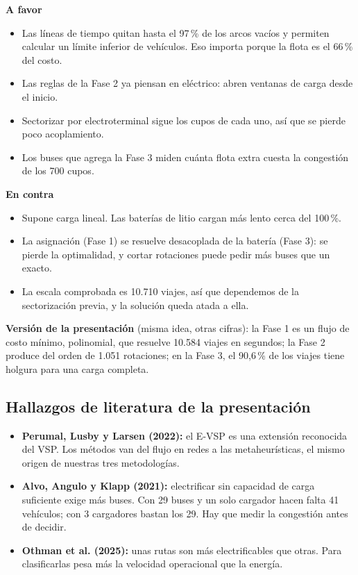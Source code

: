 \documentclass[11pt,a4paper,parskip=half]{scrartcl}
\begin{document}
\begin{minipage}[t]{0.48\linewidth}
\textbf{A favor}
\begin{itemize}
  \item Las líneas de tiempo quitan hasta el 97\,\% de los arcos vacíos y permiten calcular un límite inferior de vehículos. Eso importa porque la flota es el 66\,\% del costo.
  \item Las reglas de la Fase 2 ya piensan en eléctrico: abren ventanas de carga desde el inicio.
  \item Sectorizar por electroterminal sigue los cupos de cada uno, así que se pierde poco acoplamiento.
  \item Los buses que agrega la Fase 3 miden cuánta flota extra cuesta la congestión de los 700 cupos.
\end{itemize}
\end{minipage}\hfill
\begin{minipage}[t]{0.48\linewidth}
\textbf{En contra}
\begin{itemize}
  \item Supone carga lineal. Las baterías de litio cargan más lento cerca del 100\,\%.
  \item La asignación (Fase 1) se resuelve desacoplada de la batería (Fase 3): se pierde la optimalidad, y cortar rotaciones puede pedir más buses que un exacto.
  \item La escala comprobada es 10.710 viajes, así que dependemos de la sectorización previa, y la solución queda atada a ella.
\end{itemize}
\end{minipage}

\textbf{Versión de la presentación} (misma idea, otras cifras): la Fase 1 es un flujo de costo mínimo, polinomial, que resuelve 10.584 viajes en segundos; la Fase 2 produce del orden de 1.051 rotaciones; en la Fase 3, el 90,6\,\% de los viajes tiene holgura para una carga completa.

\subsection{Hallazgos de literatura de la presentación}
\begin{itemize}
  \item \textbf{Perumal, Lusby y Larsen (2022):} el E-VSP es una extensión reconocida del VSP. Los métodos van del flujo en redes a las metaheurísticas, el mismo origen de nuestras tres metodologías.
  \item \textbf{Alvo, Angulo y Klapp (2021):} electrificar sin capacidad de carga suficiente exige más buses. Con 29 buses y un solo cargador hacen falta 41 vehículos; con 3 cargadores bastan los 29. Hay que medir la congestión antes de decidir.
  \item \textbf{Othman et al. (2025):} unas rutas son más electrificables que otras. Para clasificarlas pesa más la velocidad operacional que la energía.
\end{itemize}
\end{document}
